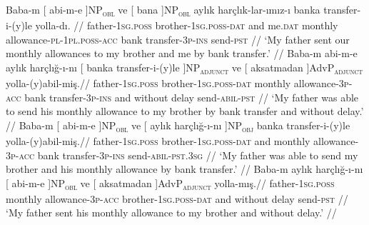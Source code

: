 \pex[exno=TS5,glspace=!1em,everygla={},everyglb={},aboveglbskip=-.15ex, interpartskip=15pt]
\label{TS5} 
\a
\begingl
\gla Baba-m {[} {abi-m-e }]NP\textsubscript{\textsc{obl}} ve {[} {bana }]NP\textsubscript{\textsc{obl}} aylık harçlık-lar-ımız-ı banka transfer-i-(y)le yolla-dı. //
\glb father-\textsc{1sg.poss} brother-\textsc{1sg.poss}-\textsc{dat} and me.\textsc{dat} monthly allowance-\textsc{pl}-\textsc{1pl.poss}-\textsc{acc} bank transfer-\textsc{3p}-\textsc{ins} send-\textsc{pst} //
\glft `My father sent our monthly allowances to my brother and me by bank transfer.' //
\endgl
\a
\begingl
\gla Baba-m abi-m-e aylık harçlığ-ı-nı {[} banka {transfer-i-(y)le }]NP\textsubscript{\textsc{adjunct}} ve {[} {aksatmadan }]AdvP\textsubscript{\textsc{adjunct}} yolla-(y)abil-miş.//
\glb father-\textsc{1sg.poss} brother-\textsc{1sg.poss}-\textsc{dat} monthly allowance-\textsc{3p}-\textsc{acc} bank transfer-\textsc{3p}-\textsc{ins} and {without delay} send-\textsc{abil}-\textsc{pst} //
\glft `My father was able to send his monthly allowance to my brother by bank transfer and without delay.' //
\endgl
\a
\begingl
\gla Baba-m {[} {abi-m-e }]NP\textsubscript{\textsc{obl}} ve {[} aylık {harçlığ-ı-nı }]NP\textsubscript{\textsc{obj}} banka transfer-i-(y)le yolla-(y)abil-miş.//
\glb father-\textsc{1sg.poss} brother-\textsc{1sg.poss}-\textsc{dat} and monthly allowance-\textsc{3p}-\textsc{acc} bank transfer-\textsc{3p}-\textsc{ins} send-\textsc{abil}-\textsc{pst.3sg} //
\glft `My father was able to send my brother and his monthly allowance by bank transfer.' //
\endgl
\a
\begingl
\gla Baba-m aylık harçlığ-ı-nı {[} {abi-m-e }]NP\textsubscript{\textsc{obl}} ve {[} {aksatmadan }]AdvP\textsubscript{\textsc{adjunct}} yolla-mış.//
\glb father-\textsc{1sg.poss} monthly allowance-\textsc{3p}-\textsc{acc} brother-\textsc{1sg.poss}-\textsc{dat} and {without delay} send-\textsc{pst} //
\glft `My father sent his monthly allowance to my brother and without delay.' //
\endgl
\xe


